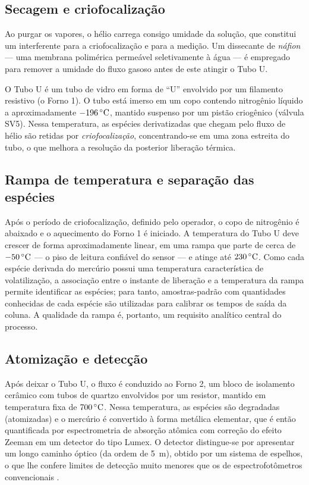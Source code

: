 \subsection{Secagem e criofocaliza\c{c}\~ao}

Ao purgar os vapores, o h\'elio carrega consigo umidade da solu\c{c}\~ao, que
constitui um interferente para a criofocaliza\c{c}\~ao e para a medi\c{c}\~ao.
Um dissecante de \emph{n\'afion} --- uma membrana polim\'erica perme\'avel
seletivamente \`a \'agua --- \'e empregado para remover a umidade do fluxo
gasoso antes de este atingir o Tubo U.

O Tubo U \'e um tubo de vidro em forma de ``U'' envolvido por um filamento
resistivo (o Forno 1). O tubo est\'a imerso em um copo contendo nitrog\^enio
l\'iquido a aproximadamente $-196\,\celsius$, mantido suspenso por um pist\~ao
criog\^enico (v\'alvula SV5). Nessa temperatura, as esp\'ecies derivatizadas que
chegam pelo fluxo de h\'elio s\~ao retidas por \emph{criofocaliza\c{c}\~ao},
concentrando-se em uma zona estreita do tubo, o que melhora a resolu\c{c}\~ao da
posterior libera\c{c}\~ao t\'ermica.

\subsection{Rampa de temperatura e separa\c{c}\~ao das esp\'ecies}

Ap\'os o per\'iodo de criofocaliza\c{c}\~ao, definido pelo operador, o copo de
nitrog\^enio \'e abaixado e o aquecimento do Forno 1 \'e iniciado. A temperatura
do Tubo U deve crescer de forma aproximadamente linear, em uma rampa que parte
de cerca de $-50\,\celsius$ --- o piso de leitura confi\'avel do sensor --- e
atinge at\'e $230\,\celsius$. Como cada esp\'ecie derivada do merc\'urio possui
uma temperatura caracter\'istica de volatiliza\c{c}\~ao, a associa\c{c}\~ao
entre o instante de libera\c{c}\~ao e a temperatura da rampa permite identificar
as esp\'ecies; para tanto, amostras-padr\~ao com quantidades conhecidas de cada
esp\'ecie s\~ao utilizadas para calibrar os tempos de sa\'ida da coluna. A
qualidade da rampa \'e, portanto, um requisito anal\'itico central do processo.

\subsection{Atomiza\c{c}\~ao e detec\c{c}\~ao}

Ap\'os deixar o Tubo U, o fluxo \'e conduzido ao Forno 2, um bloco de
isolamento cer\^amico com tubos de quartzo envolvidos por um resistor, mantido
em temperatura fixa de $700\,\celsius$. Nessa temperatura, as esp\'ecies s\~ao
degradadas (atomizadas) e o merc\'urio \'e convertido \`a forma met\'alica
elementar, que \'e ent\~ao quantificada por espectrometria de absor\c{c}\~ao
at\^omica com corre\c{c}\~ao do efeito Zeeman em um detector do tipo Lumex. O
detector distingue-se por apresentar um longo caminho \'optico (da ordem de
5~m), obtido por um sistema de espelhos, o que lhe confere limites de detec\c{c}\~ao
muito menores que os de espectrofot\^ometros convencionais \cite{lumex}.

